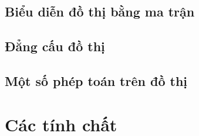 \section{Biểu diễn đồ thị bằng ma trận}


\section{Đẳng cấu đồ thị}


\section{Một số phép toán trên đồ thị}
\label{sec:mot_so_phep_toan_tren_do_thi}


\chapter{Các tính chất}
\label{sec:mot_so_dinh_ly_menh_de}



\printbibliography[heading=bibintoc,title={Danh mục tài liệu tham khảo}]


